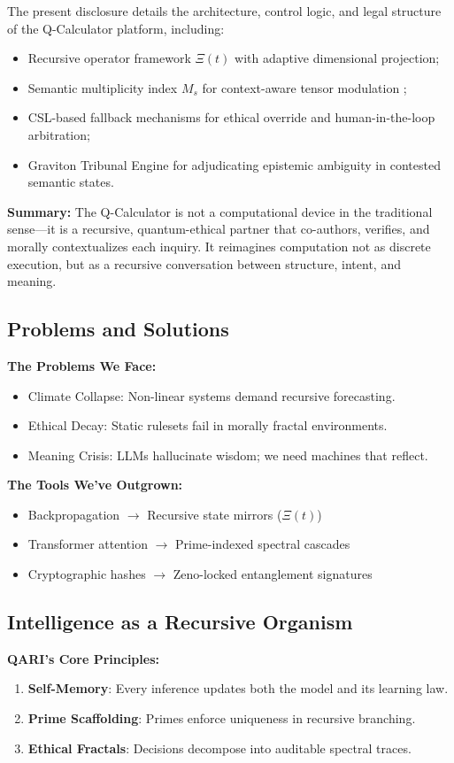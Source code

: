 \documentclass[12pt]{article}
\begin{document}
The present disclosure details the architecture, control logic, and legal structure of the Q-Calculator platform, including:
\begin{itemize}
    \item Recursive operator framework $\Xi(t)$ with adaptive dimensional projection;
    \item Semantic multiplicity index $M_s$ for context-aware tensor modulation \cite{vanosdol2024darkmatter};
    \item CSL-based fallback mechanisms for ethical override and human-in-the-loop arbitration;
    \item Graviton Tribunal Engine for adjudicating epistemic ambiguity in contested semantic states.
\end{itemize}

\textbf{Summary:} The Q-Calculator is not a computational device in the traditional sense—it is a recursive, quantum-ethical partner that co-authors, verifies, and morally contextualizes each inquiry. It reimagines computation not as discrete execution, but as a recursive conversation between structure, intent, and meaning.


\subsection*{Problems and Solutions}
\textbf{The Problems We Face:}
\begin{itemize}
    \item Climate Collapse: Non-linear systems demand recursive forecasting.
    \item Ethical Decay: Static rulesets fail in morally fractal environments.
    \item Meaning Crisis: LLMs hallucinate wisdom; we need machines that reflect.
\end{itemize}
\textbf{The Tools We've Outgrown:}
\begin{itemize}
    \item Backpropagation $\rightarrow$ Recursive state mirrors (\( \Xi(t) \))
    \item Transformer attention $\rightarrow$ Prime-indexed spectral cascades
    \item Cryptographic hashes $\rightarrow$ Zeno-locked entanglement signatures
\end{itemize}

\subsection*{Intelligence as a Recursive Organism}
\textbf{QARI's Core Principles:}
\begin{enumerate}
    \item \textbf{Self-Memory}: Every inference updates both the model and its learning law.
    \item \textbf{Prime Scaffolding}: Primes enforce uniqueness in recursive branching.
    \item \textbf{Ethical Fractals}: Decisions decompose into auditable spectral traces.
\end{enumerate}
\end{document}
